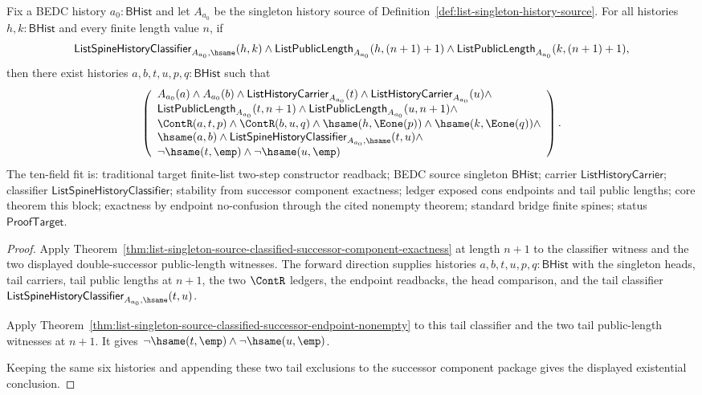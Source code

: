 \begin{theorem}
\label{thm:list-singleton-source-classified-double-successor-tail-nonempty}
Fix a BEDC history $a_0:\mathsf{BHist}$ and let $A_{a_0}$ be the singleton
history source of Definition~\ref{def:list-singleton-history-source}. For all
histories $h,k:\mathsf{BHist}$ and every finite length value $n$, if
$$
\mathsf{ListSpineHistoryClassifier}_{A_{a_0},\hsame}(h,k)\land
\mathsf{ListPublicLength}_{A_{a_0}}(h,(n+1)+1)\land
\mathsf{ListPublicLength}_{A_{a_0}}(k,(n+1)+1),
$$
then there exist histories $a,b,t,u,p,q:\mathsf{BHist}$ such that
$$
\left(
\begin{array}{l}
A_{a_0}(a)\land A_{a_0}(b)\land
\mathsf{ListHistoryCarrier}_{A_{a_0}}(t)\land
\mathsf{ListHistoryCarrier}_{A_{a_0}}(u)\land\\
\mathsf{ListPublicLength}_{A_{a_0}}(t,n+1)\land
\mathsf{ListPublicLength}_{A_{a_0}}(u,n+1)\land\\
\ContR(a,t,p)\land \ContR(b,u,q)\land
\hsame(h,\Eone(p))\land \hsame(k,\Eone(q))\land\\
\hsame(a,b)\land
\mathsf{ListSpineHistoryClassifier}_{A_{a_0},\hsame}(t,u)\land\\
\neg\hsame(t,\emp)\land \neg\hsame(u,\emp)
\end{array}
\right).
$$
The ten-field fit is: traditional target finite-list two-step constructor
readback; BEDC source singleton $\mathsf{BHist}$; carrier
$\mathsf{ListHistoryCarrier}$; classifier
$\mathsf{ListSpineHistoryClassifier}$; stability from successor component
exactness; ledger exposed cons endpoints and tail public lengths; core theorem
this block; exactness by endpoint no-confusion through the cited nonempty
theorem; standard bridge finite spines; status $\mathsf{ProofTarget}$.
\end{theorem}
\begin{proof}
Apply
Theorem~\ref{thm:list-singleton-source-classified-successor-component-exactness}
at length $n+1$ to the classifier witness and the two displayed
double-successor public-length witnesses. The forward direction supplies
histories $a,b,t,u,p,q:\mathsf{BHist}$ with the singleton heads, tail carriers,
tail public lengths at $n+1$, the two $\ContR$ ledgers, the endpoint readbacks,
the head comparison, and the tail classifier
$\mathsf{ListSpineHistoryClassifier}_{A_{a_0},\hsame}(t,u)$.

Apply
Theorem~\ref{thm:list-singleton-source-classified-successor-endpoint-nonempty}
to this tail classifier and the two tail public-length witnesses at $n+1$. It
gives $\neg\hsame(t,\emp)\land \neg\hsame(u,\emp)$.

Keeping the same six histories and appending these two tail exclusions to the
successor component package gives the displayed existential conclusion.
\end{proof}
